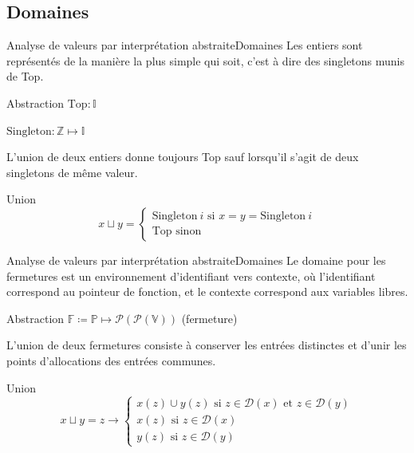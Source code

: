 \documentclass{beamer}
\begin{document}
\iffalse

\subsection{Domaines}

\begin{frame}{Analyse de valeurs par interprétation abstraite}{Domaines}
    Les entiers sont représentés de la manière la plus simple qui soit, c'est à dire des singletons munis de Top.
    
    \begin{block}{Abstraction}
        $\text{Top} : \mathbb{I}$

        $\text{Singleton} : \mathbb{Z} \mapsto \mathbb{I}$
    \end{block}

    L'union de deux entiers donne toujours Top sauf lorsqu'il s'agit de deux singletons de même valeur.

    \begin{block}{Union}
        $$
        x \sqcup y =
        \begin{cases}
            \text{Singleton} ~ i \text{ si } x = y = \text{Singleton} ~ i  \\
            \text{Top} \text{ sinon}
        \end{cases}
        $$
    \end{block}
\end{frame}

\begin{frame}{Analyse de valeurs par interprétation abstraite}{Domaines}
    Le domaine pour les fermetures est un environnement d'identifiant vers contexte, où l'identifiant correspond au pointeur de fonction, et le contexte correspond aux variables libres.
    \begin{block}{Abstraction}
        $\mathbb{F} \coloneqq \mathbb{P} \mapsto \mathcal{P}(\mathcal{P}(\mathbb{V}))$ (fermeture)
    \end{block}

    L'union de deux fermetures consiste à conserver les entrées distinctes et d'unir les points d'allocations des entrées communes.%
    
    \begin{block}{Union}
        $$
        x \sqcup y = z \rightarrow
        \begin{cases}
            x(z) \cup y(z) \text{ si } z \in \mathcal{D}(x) \text{ et } z \in \mathcal{D}(y) \\
            x(z) \text{ si } z \in \mathcal{D}(x) \\
            y(z) \text{ si } z \in \mathcal{D}(y)
        \end{cases}
        $$
    \end{block}
\end{frame}
\end{document}
